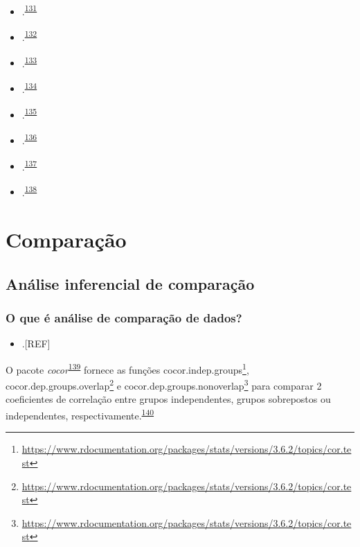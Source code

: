 \documentclass[
  a4paper,
]{book}
\providecommand{\tightlist}{%
  \setlength{\itemsep}{0pt}\setlength{\parskip}{0pt}}
\renewcommand{\href}[2]{#2\footnote{\url{#1}}}
\newenvironment{infobox}[1]
  {
  \begin{itemize}
  \renewcommand{\labelitemi}{
    \raisebox{-.7\height}[0pt][0pt]{
      {\setkeys{Gin}{width=3em,keepaspectratio}
        \texttt{[image: \#1]}}
    }
  }
  \setlength{\fboxsep}{1em}
  \begin{blackbox}
  \item
  }
  {
  \end{blackbox}
  \end{itemize}
  }
\begin{document}
\begin{itemize}
\item
  .\textsuperscript{\protect\hyperlink{ref-dwivedi2019}{131}}
\item
  .\textsuperscript{\protect\hyperlink{ref-Dwivedi2022}{132}}
\item
  .\textsuperscript{\protect\hyperlink{ref-Kim2017}{133}}
\item
  .\textsuperscript{\protect\hyperlink{ref-marusteri2010}{134}}
\item
  .\textsuperscript{\protect\hyperlink{ref-mishra2019}{135}}
\item
  .\textsuperscript{\protect\hyperlink{ref-ray2021}{136}}
\item
  .\textsuperscript{\protect\hyperlink{ref-nayak2011}{137}}
\item
  .\textsuperscript{\protect\hyperlink{ref-shankar2014}{138}}
\end{itemize}

\hypertarget{analise-comparacao}{%
\chapter{\texorpdfstring{\textbf{Comparação}}{Comparação}}\label{analise-comparacao}}

\hypertarget{analise-inferencial-comparacao}{%
\section{Análise inferencial de comparação}\label{analise-inferencial-comparacao}}

\hypertarget{o-que-uxe9-anuxe1lise-de-comparauxe7uxe3o-de-dados}{%
\subsection{O que é análise de comparação de dados?}\label{o-que-uxe9-anuxe1lise-de-comparauxe7uxe3o-de-dados}}

\begin{itemize}
\tightlist
\item
  .{[}REF{]}
\end{itemize}

\begin{infobox}{images/Rlogo}
O pacote \emph{cocor}\textsuperscript{\protect\hyperlink{ref-cocor-4}{139}} fornece as funções \href{https://www.rdocumentation.org/packages/stats/versions/3.6.2/topics/cor.test}{cocor.indep.groups}, \href{https://www.rdocumentation.org/packages/stats/versions/3.6.2/topics/cor.test}{cocor.dep.groups.overlap} e \href{https://www.rdocumentation.org/packages/stats/versions/3.6.2/topics/cor.test}{cocor.dep.groups.nonoverlap} para comparar 2 coeficientes de correlação entre grupos independentes, grupos sobrepostos ou independentes, respectivamente.\textsuperscript{\protect\hyperlink{ref-cocor}{140}}

\end{infobox}
\end{document}
